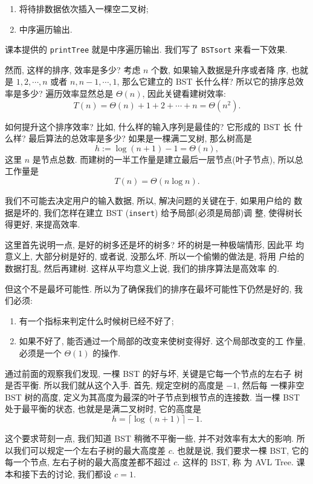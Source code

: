 \documentclass[a4paper]{ctexart}
\theoremstyle{definition}
\theoremstyle{definition}
\begin{document}
\begin{enumerate}
\item 将待排数据依次插入一棵空二叉树;
\item 中序遍历输出.
\end{enumerate}

课本提供的 \verb|printTree| 就是中序遍历输出. 我们写了 \verb|BSTsort|
来看一下效果.

然而, 这样的排序, 效率是多少? 考虑 $n$ 个数, 如果输入数据是升序或者降
序, 也就是 $1, 2, \cdots, n$ 或者 $n, n - 1, \cdots, 1$, 那么它建立的
BST 长什么样? 所以它的排序总效率是多少? 遍历效率显然总是 $\Theta(n)$,
因此关键看建树效率:
$$
T(n) = \Theta(n) + 1 + 2 + \cdots + n = \Theta(n^2).
$$

如何提升这个排序效率? 比如, 什么样的输入序列是最佳的? 它形成的 BST 长
什么样? 最后算法的总效率是多少? 如果是一棵满二叉树, 那么树高是
$$
h :=\log (n + 1) - 1 = \Theta(n),
$$
这里 $n$ 是节点总数. 而建树的一半工作量是建立最后一层节点(叶子节点), 所以总工作量是
$$
T(n) = \Theta(n\log n).
$$

我们不可能去决定用户的输入数据, 所以, 解决问题的关键在于, 如果用户给的
数据是坏的, 我们怎样在建立 BST (\verb|insert|) 给予局部(必须是局部)调
整, 使得树长得更好, 来提高效率.

这里首先说明一点, 是好的树多还是坏的树多? 坏的树是一种极端情形, 因此平
均意义上, 大部分树是好的, 或者说, 没那么坏. 所以一个偷懒的做法是, 将用
户给的数据打乱, 然后再建树. 这样从平均意义上说, 我们的排序算法是高效率
的.

但这个不是最坏可能性. 所以为了确保我们的排序在最坏可能性下仍然是好的,
我们必须:

\begin{enumerate}
\item 有一个指标来判定什么时候树已经不好了;
\item 如果不好了, 能否通过一个局部的改变来使树变得好. 这个局部改变的工
  作量, 必须是一个 $\Theta(1)$ 的操作.
\end{enumerate}

通过前面的观察我们发现, 一棵 BST 的好与坏, 关键是它每一个节点的左右子
树是否平衡. 所以我们就从这个入手. 首先, 规定空树的高度是 $-1$, 然后每
一棵非空 BST 树的高度, 定义为其高度为最深的叶子节点到根节点的连接数.
当一棵 BST 处于最平衡的状态, 也就是是满二叉树时, 它的高度是
$$
h = \lceil \log (n + 1) \rceil - 1.
$$

这个要求苛刻一点, 我们知道 BST 稍微不平衡一些, 并不对效率有太大的影响.
所以我们可以规定一个左右子树的最大高度差 $c$. 也就是说, 我们要求一棵
BST, 它的每一个节点, 左右子树的最大高度差都不超过 $c$. 这样的 BST, 称
为 AVL Tree. 课本和接下去的讨论, 我们都设 $c = 1$.
\end{document}
